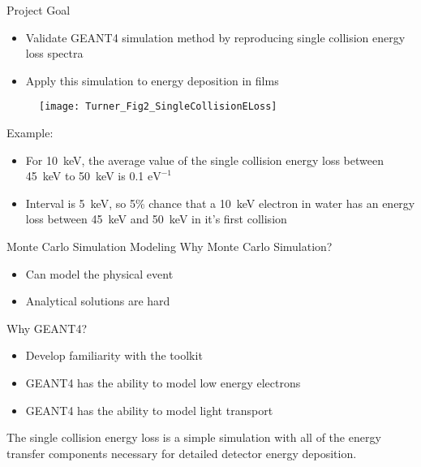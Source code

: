 \documentclass[compress]{beamer}
\begin{document}
\begin{frame}{Project Goal}
  \centering
  \begin{itemize}
    \item Validate GEANT4 simulation method by reproducing single collision energy loss spectra
    \item Apply this simulation to energy deposition in films
  \end{itemize}
  \begin{figure}
    \texttt{[image: Turner\_Fig2\_SingleCollisionELoss]}
  \end{figure}
  \flushleft
  \small
  Example:
  \begin{itemize}
    \tiny
    \item For \SI{10}{\keV}, the average value of the single collision energy loss between \SI{45}{\keV} to \SI{50}{\keV} is 0.1 $\text{eV}^{-1}$
    \item Interval is \SI{5}{\keV}, so 5\% chance that a \SI{10}{\keV} electron in water has an energy loss between \SI{45}{\keV} and \SI{50}{\keV} in it's first collision
  \end{itemize}
\end{frame}
\begin{frame}{Monte Carlo Simulation Modeling}
Why Monte Carlo Simulation?
\begin{itemize}
  \item Can model the physical event
  \item Analytical solutions are hard
\end{itemize}
Why GEANT4?
\begin{itemize}
  \item Develop familiarity with the toolkit
  \item GEANT4 has the ability to model low energy electrons
  \item GEANT4 has the ability to model light transport
\end{itemize}
\centering
The single collision energy loss is a simple simulation with all of the energy transfer components necessary for detailed detector energy deposition.
\end{frame}
\end{document}
